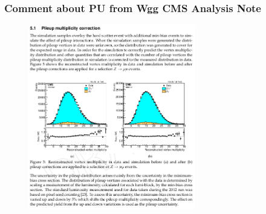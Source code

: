 \begin{frame}\frametitle{Comment about PU from Wgg CMS Analysis Note}
  \begin{figure}[htb]
    \begin{center}
       \includegraphics[width=0.65\textwidth]{../figs/ForPresentation/PUmultiplicityCorrection_Wgg.png} 
    \end{center}
  \end{figure}
\end{frame}%

